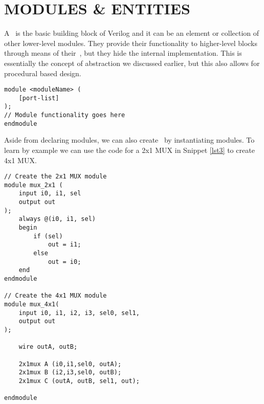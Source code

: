\documentclass[]{report}
\newcommand{\keyword}[1]{{{\color{green}{#1}\,}}}
\begin{document}
\section{MODULES \& ENTITIES}

A \keyword{module} is the basic building block of Verilog and it can be an element or collection of other lower-level modules. They provide their functionality to higher-level blocks through means of their \keyword{ports}, but they hide the internal implementation. This is essentially the concept of abstraction we discussed earlier, but this also allows for procedural based design. 

\begin{lstlisting}[caption={Module Declaration Syntax}, label={lst4}]
module <moduleName> (
	[port-list]
);
// Module functionality goes here
endmodule
\end{lstlisting}

Aside from declaring modules, we can also create \keyword{entities} by instantiating modules. To learn by example we can use the code for a 2x1 MUX in Snippet \ref{lst3} to create  4x1 MUX.

\begin{lstlisting}[caption={Module Instantition Example (4x1 MUX)}]
// Create the 2x1 MUX module
module mux_2x1 (
	input i0, i1, sel
	output out
);
	always @(i0, i1, sel)
	begin
		if (sel)
			out = i1;
		else
			out = i0;
	end
endmodule

// Create the 4x1 MUX module
module mux_4x1(
	input i0, i1, i2, i3, sel0, sel1,
	output out
);

	wire outA, outB;
	
	2x1mux A (i0,i1,sel0, outA);
	2x1mux B (i2,i3,sel0, outB);
	2x1mux C (outA, outB, sel1, out);
	
endmodule
\end{lstlisting}
\end{document}
